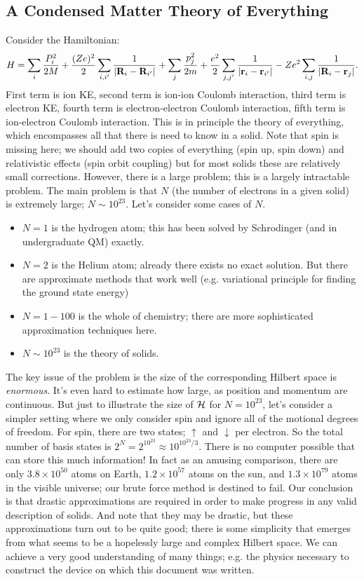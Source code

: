 \subsection{A Condensed Matter Theory of Everything}
Consider the Hamiltonian:
\begin{equation}
    H = \sum_i \frac{P_i^2}{2M} + \frac{(Ze)^2}{2}\sum_{i, i'}\frac{1}{\lvert \mathbf{R}_i - \mathbf{R}_{i'} \rvert} + \sum_j \frac{p_j^2}{2m} + \frac{e^2}{2}\sum_{j, j'}\frac{1}{\lvert \mathbf{r}_i - \mathbf{r}_{i'} \rvert} - Ze^2\sum_{i, j}\frac{1}{\lvert \mathbf{R}_i - \mathbf{r}_j \rvert}.
\end{equation}
First term is ion KE, second term is ion-ion Coulomb interaction, third term is electron KE, fourth term is electron-electron Coulomb interaction, fifth term is ion-electron Coulomb interaction. This is in principle the theory of everything, which encompasses all that there is need to know in a solid. Note that spin is missing here; we should add two copies of everything (spin up, spin down) and relativistic effects (spin orbit coupling) but for most solids these are relatively small corrections. However, there is a large problem; this is a largely intractable problem. The main problem is that $N$ (the number of electrons in a given solid) is extremely large; $N \sim 10^{23}$. Let's consider some cases of $N$.
\begin{itemize}
    \item $N = 1$ is the hydrogen atom; this has been solved by Schrodinger (and in undergraduate QM) exactly.
    \item $N = 2$ is the Helium atom; already there exists no exact solution. But there are approximate methods that work well (e.g. variational principle for finding the ground state energy)
    \item $N = 1-100$ is the whole of chemistry; there are more sophisticated approximation techniques here.
    \item $N \sim 10^{23}$ is the theory of solids.
\end{itemize}
The key issue of the problem is the size of the corresponding Hilbert space is \emph{enormous}. It's even hard to estimate how large, as position and momentum are continuous. But just to illustrate the size of $\mathcal{H}$ for $N = 10^{23}$, let's consider a simpler setting where we only consider spin and ignore all of the motional degrees of freedom. For spin, there are two states; $\uparrow$ and $\downarrow$ per electron. So the total number of basis states is $2^{N} = 2^{10^{23}} \approx 10^{10^{23}/3}$. There is no computer possible that can store this much information! In fact as an amusing comparison, there are only $3.8 \times 10^{50}$ atoms on Earth, $1.2 \times 10^{57}$ atoms on the sun, and $1.3 \times 10^{79}$ atoms in the visible universe; our brute force method is destined to fail. Our conclusion is that drastic approximations are required in order to make progress in any valid description of solids. And note that they may be drastic, but these approximations turn out to be quite good; there is some simplicity that emerges from what seems to be a hopelessly large and complex Hilbert space. We can achieve a very good understanding of many things; e.g. the physics necessary to construct the device on which this document was written.

